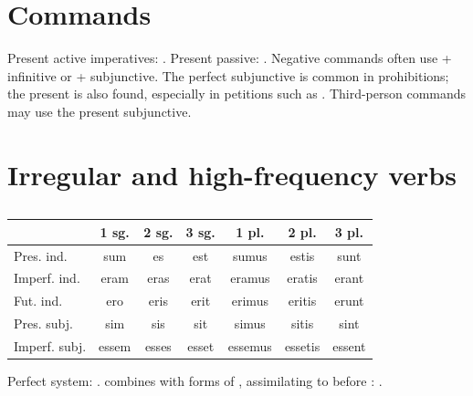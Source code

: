 \section{Commands}


Present active imperatives: . Present passive: . Negative
commands often use  + infinitive or  +
subjunctive. The perfect subjunctive is common in prohibitions; the present is
also found, especially in petitions such as . Third-person
commands may use the present subjunctive.

\section{Irregular and high-frequency verbs}

\subsection*{}

\begin{center}\small
\begin{tabular}{@{}lcccccc@{}}
  \toprule & 1 sg. & 2 sg. & 3 sg. & 1 pl. & 2 pl. & 3 pl. \\
  \midrule
  Pres. ind. & sum & es & est & sumus & estis & sunt \\
  Imperf. ind. & eram & eras & erat & eramus & eratis & erant \\
  Fut. ind. & ero & eris & erit & erimus & eritis & erunt \\
  Pres. subj. & sim & sis & sit & simus & sitis & sint \\
  Imperf. subj. & essem & esses & esset & essemus & essetis & essent \\
  \bottomrule
\end{tabular}
\end{center}

Perfect system: .  combines  with forms of , assimilating to
 before : .

